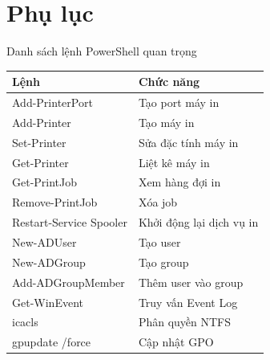 \documentclass{beamer}
\begin{document}
    \section{Phụ lục}
    \begin{frame}{Danh sách lệnh PowerShell quan trọng}
        \begin{table}[ht]
            \centering
            \tiny
            \begin{tabular}{|l|l|}
            \hline
            \textbf{Lệnh} & \textbf{Chức năng} \\
            \hline
            Add-PrinterPort & Tạo port máy in \\
            \hline
            Add-Printer & Tạo máy in \\
            \hline
            Set-Printer & Sửa đặc tính máy in \\
            \hline
            Get-Printer & Liệt kê máy in \\
            \hline
            Get-PrintJob & Xem hàng đợi in \\
            \hline
            Remove-PrintJob & Xóa job \\
            \hline
            Restart-Service Spooler & Khởi động lại dịch vụ in \\
            \hline
            New-ADUser & Tạo user \\
            \hline
            New-ADGroup & Tạo group \\
            \hline
            Add-ADGroupMember & Thêm user vào group \\
            \hline
            Get-WinEvent & Truy vấn Event Log \\
            \hline
            icacls & Phân quyền NTFS \\
            \hline
            gpupdate /force & Cập nhật GPO \\
            \hline
            \end{tabular}
        \end{table}
    \end{frame}
\end{document}
